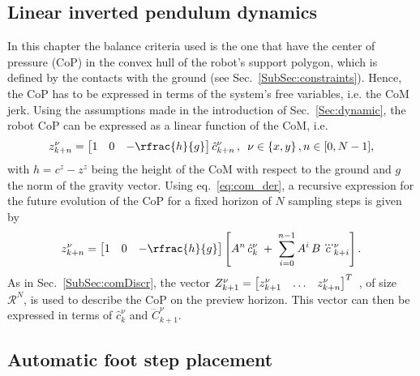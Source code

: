 \subsection{Linear inverted pendulum dynamics}
\label{SubSec:LIPM}

In this chapter the balance criteria used is the one that have the center of pressure (CoP) in the convex hull of the robot's support polygon, which is defined by the contacts with the ground
\cite{Kajita:icra:2003} (see Sec.~\ref{SubSec:constraints}).
Hence, the CoP has to be expressed in terms of the system's free variables, i.e. the CoM jerk.
Using the assumptions made in the introduction of Sec.~\ref{Sec:dynamic}, the robot CoP can be expressed as a linear function of the CoM, i.e.
\begin{equation*}
    z_{k+n}^{\nu} =
    \begin{bmatrix}
        1 & 0 & -\rfrac{h}{g}
    \end{bmatrix} \hat{c}_{k+n}^\nu
    \, , \,\,\, \nu \in \left\{ x,y \right\}
    , n \in [0,N-1]
    ,
\end{equation*}
with $h=c^z-z^z$ being the height of the CoM with respect to the ground and $g$ the norm of the gravity vector.
Using eq.~\eqref{eq:com_der}, a recursive expression for the future evolution of the CoP for a fixed horizon of $N$ sampling steps  is given by
\begin{equation}
    \label{eq:zmp_horizon}
   	z_{k+n}^{\nu} =
   	\begin{bmatrix}
        1 & 0 & -\rfrac{h}{g}
    \end{bmatrix} \left[ A^n \, \hat{c}_{k}^{\nu} \;+\; \sum_{i=0}^{n-1}{A^{i}\,B\,
  \dddot{c}^{\nu}_{k+i}} \right]
  .
\end{equation}
As in Sec.~\ref{SubSec:comDiscr}, the vector
$	Z_{k+1}^\nu =
    \begin{bmatrix}
        z_{k+1}^\nu &
        \hdots &
        z_{k+n}^\nu \notag
  \end{bmatrix}^T$~,
of size $\mathcal{R}^N$, is used to describe the CoP on the preview horizon.
This vector can then be expressed in terms of $\hat{c}_k^\nu$
and $\dddot{C}_{k+1}^\nu$.

\subsection{Automatic foot step placement}
\label{SubSec:automaticFootPlacement}

